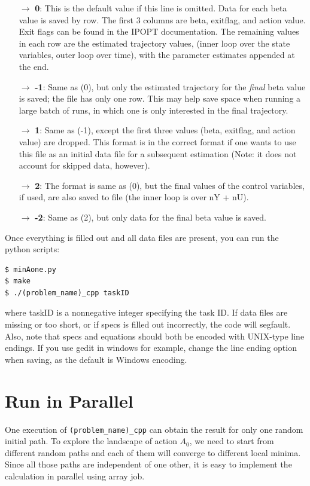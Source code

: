 \documentclass[11pt]{article}
\begin{document}
{\begin{itemize}
\item[$\rightarrow$] {\bf 0}: This is the default value if this line is omitted. Data for each beta value is saved by row. The first 3 columns are beta, exitflag, and action value. Exit flags can be found in the IPOPT documentation. The remaining values in each row are the estimated trajectory values, (inner loop over the state variables, outer loop over time), with the parameter estimates appended at the end. 

\item[$\rightarrow$] {\bf -1}: Same as (0), but only the estimated trajectory for the {\it final} beta value is saved; the file has only one row. This may help save space when running a large batch of runs, in which one is only interested in the final trajectory.

\item[$\rightarrow$] {\bf 1}: Same as (-1), except the first three values (beta, exitflag, and action value) are dropped. This format is in the correct format if one wants to use this file as an initial data file for a subsequent estimation (Note: it does not account for skipped data, however).

\item[$\rightarrow$] {\bf 2}: The format is same as (0), but the final values of the control variables, if used, are also saved to file (the inner loop is over nY + nU).

\item[$\rightarrow$] {\bf -2}: Same as (2), but only data for the final beta value is saved.

\end{itemize}



Once everything is filled out and all data files are present, you can run the python scripts:
\begin{verbatim}
$ minAone.py
$ make
$ ./(problem_name)_cpp taskID
\end{verbatim}
where taskID is a nonnegative integer specifying the task ID. If data files are missing or too short, or if specs is filled out incorrectly, the code will segfault. Also, note that specs and equations should both be encoded with UNIX-type line endings. If you use gedit in windows for example, change the line ending option when saving, as the default is Windows encoding. 

\section{Run in Parallel}
One execution of \texttt{(problem\_name)\_cpp} can obtain the result for only one random initial path.
To explore the landscape of action $A_0$, we need to start from different random paths and each of them will converge to different local minima. Since all those paths are independent of one other, it is easy to implement the calculation in parallel using array job.

}
\end{document}
